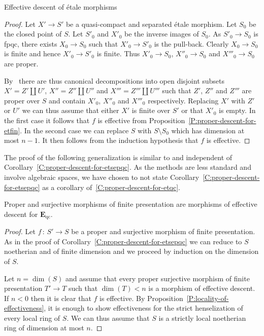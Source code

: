 \documentclass[a4paper,twoside,11pt]{amsart}[2009/07/02] %
\newcommand{\pref}[1]{\eqref{#1}}
\newcommand{\map}[3]{#1\,:\, #2\rightarrow #3}
\newcommand{\etale}{\'{e}tale}
\newcommand{\catE}{\mathbf{E}}
\newcommand{\qc}{\mathrm{qc}}
\begin{document}
\begin{section}{Effective descent of \etale{} morphisms}
\begin{proof}
Let $X'\to S'$ be a quasi-compact and separated \etale{} morphism. Let $S_0$
be the closed point of $S$. Let $S'_0$ and $X'_0$ be the inverse images of
$S_0$. As $S'_0\to S_0$ is fpqc, there exists $X_0\to S_0$ such that $X'_0\to
S'_0$ is the pull-back. Clearly $X_0\to S_0$ is finite and hence $X'_0\to S'_0$
is finite. Thus $X'_0\to S_0$, $X''_0\to S_0$ and $X'''_0\to S_0$ are proper.

By~\cite[Cor.~5.5.2]{egaIII} there are thus canonical decompositions into open
disjoint subsets $X'=Z'\amalg U'$, $X''=Z''\amalg U''$ and $X'''=Z'''\amalg
U'''$ such that $Z'$, $Z''$ and $Z'''$ are proper over $S$ and contain $X'_0$,
$X''_0$ and $X'''_0$ respectively. Replacing $X'$ with $Z'$ or $U'$ we can thus
assume that either $X'$ is finite over $S'$ or that $X'_0$ is empty. In the
first case it follows that $f$ is effective from
Proposition~\pref{P:proper-descent-for-etfin}. In the second case we can
replace $S$ with $S\setminus S_0$ which has dimension at most $n-1$. It then
follows from the induction hypothesis that $f$ is effective.
\end{proof}

The proof of the following generalization is similar to and independent of
Corollary~\pref{C:proper-descent-for-etsepqc}. As the methods are less
standard and involve algebraic spaces, we have chosen to not state
Corollary~\pref{C:proper-descent-for-etsepqc} as a corollary
of~\pref{C:proper-descent-for-etqc}.

\begin{corollary}\label{C:proper-descent-for-etqc}
Proper and surjective morphisms of finite presentation are morphisms of
effective descent for $\catE_{\qc}$.
\end{corollary}
\begin{proof}
Let $\map{f}{S'}{S}$ be a proper and surjective morphism of finite
presentation. As in the proof of Corollary~\pref{C:proper-descent-for-etsepqc}
we can reduce to $S$ noetherian and of finite dimension and we proceed by
induction on the dimension of $S$.

Let $n=\dim(S)$ and assume that every proper surjective morphism of finite
presentation $T'\to T$ such that $\dim(T)<n$ is a morphism of effective
descent. If $n<0$ then it is clear that $f$ is effective. By
Proposition~\pref{P:locality-of-effectiveness}, it is enough to show
effectiveness for the strict henselization of every local ring of $S$. We can
thus assume that $S$ is a strictly local noetherian ring of dimension at most
$n$.


\end{proof}
\end{section}
\end{document}
